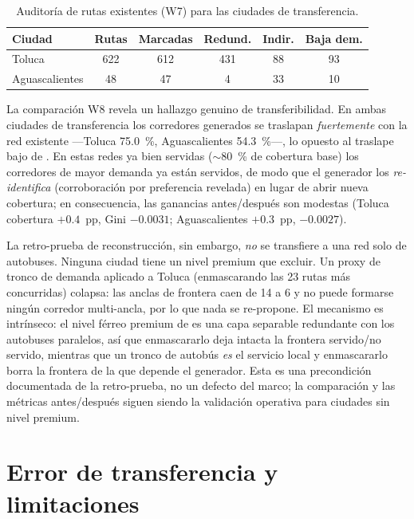 \begin{table}[htbp]
\centering
\caption{Auditoría de rutas existentes (W7) para las ciudades de transferencia.}
\label{tab:transfer-audit}
\begin{tabular}{l S[table-format=3.0] S[table-format=3.0] S[table-format=3.0] S[table-format=2.0] S[table-format=2.0]}
\toprule
Ciudad & {Rutas} & {Marcadas} & {Redund.} & {Indir.} & {Baja dem.} \\
\midrule
Toluca         & 622 & 612 & 431 & 88 & 93 \\
Aguascalientes & 48  & 47  & 4   & 33 & 10 \\
\bottomrule
\end{tabular}
\end{table}

La comparación W8 revela un hallazgo genuino de transferibilidad. En ambas ciudades de
transferencia los corredores generados se traslapan \emph{fuertemente} con la red
existente ---Toluca \SI{75.0}{\percent}, Aguascalientes \SI{54.3}{\percent}---, lo
opuesto al traslape bajo de \zmg. En estas redes ya bien servidas
($\sim$\SI{80}{\percent} de cobertura base) los corredores de mayor demanda ya están
servidos, de modo que el generador los \emph{re-identifica} (corroboración por
preferencia revelada) en lugar de abrir nueva cobertura; en consecuencia, las
ganancias antes/después son modestas (Toluca cobertura $+\num{0.4}$~pp, Gini
$-\num{0.0031}$; Aguascalientes $+\num{0.3}$~pp, $-\num{0.0027}$).

La retro-prueba de reconstrucción, sin embargo, \emph{no} se transfiere a una red solo
de autobuses. Ninguna ciudad tiene un nivel premium que excluir. Un proxy de tronco de
demanda aplicado a Toluca (enmascarando las \num{23} rutas más concurridas) colapsa:
las anclas de frontera caen de \num{14} a \num{6} y no puede formarse ningún corredor
multi-ancla, por lo que nada se re-propone. El mecanismo es intrínseco: el nivel férreo
premium de \zmg es una capa separable redundante con los autobuses paralelos, así que
enmascararlo deja intacta la frontera servido/no servido, mientras que un tronco de
autobús \emph{es} el servicio local y enmascararlo borra la frontera de la que depende
el generador. Esta es una precondición documentada de la retro-prueba, no un defecto
del marco; la comparación y las métricas antes/después siguen siendo la validación
operativa para ciudades sin nivel premium.

\section{Error de transferencia y limitaciones}
\label{sec:transf-limits}

